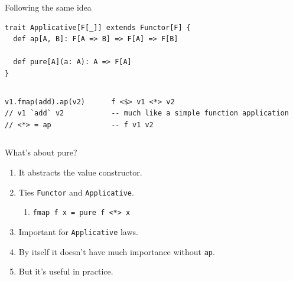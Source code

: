 \documentclass[presentation,aspectratio=169,smaller]{beamer}
\begin{document}
\begin{frame}[label={sec:org23c777e},fragile]{Following the same idea}
 \begin{verbatim}
trait Applicative[F[_]] extends Functor[F] {
  def ap[A, B]: F[A => B] => F[A] => F[B]

  def pure[A](a: A): A => F[A]
}
\end{verbatim}

\pause

\begin{columns}
\begin{column}[t]{0.46\columnwidth}
\begin{verbatim}
v1.fmap(add).ap(v2)
// v1 `add` v2
// <*> = ap
\end{verbatim}

\pause
\end{column}

\begin{column}[t]{0.46\columnwidth}
\begin{verbatim}
f <$> v1 <*> v2
-- much like a simple function application
-- f v1 v2
\end{verbatim}
\end{column}
\end{columns}
\end{frame}

\begin{frame}[label={sec:org80e7c9a},fragile]{What's about pure?}
 \begin{enumerate}
\item It abstracts the value constructor.
\item Ties \texttt{Functor} and \texttt{Applicative}.
\begin{enumerate}
\item \texttt{fmap f x = pure f <*> x}
\end{enumerate}
\item Important for \texttt{Applicative} laws.
\item By itself it doesn't have much importance without \texttt{ap}.
\item But it's useful in practice.
\end{enumerate}
\end{frame}
\end{document}
